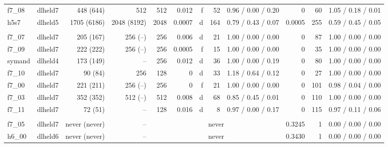 \begin{tabular}{@{}llrrrrrrcrrc@{}}
f7\_08 & dlheld7 & 448 (644) & 512 & 512 & 0.012 & f & 52 & 0.96 / 0.00 / 0.20 & 0 & 60 & 1.05 / 0.18 / 0.01\\
h5s7 & dlheld5 & 1705 (6186) & 2048 (8192) & 2048 & 0.0007 & d & 164 & 0.79 / 0.43 / 0.07 & 0.0005 & 255 & 0.59 / 0.45 / 0.05\\
\addlinespace[2pt]
\multicolumn{12}{@{}l}{\emph{Signed-sum mixtures}}\\
f7\_07 & dlheld7 & 205 (167) & 256 (--) & 256 & 0.006 & d & 21 & 1.00 / 0.00 / 0.00 & 0 & 87 & 1.00 / 0.00 / 0.00\\
f7\_09 & dlheld7 & 222 (222) & 256 (--) & 256 & 0.0005 & f & 15 & 1.00 / 0.00 / 0.00 & 0 & 35 & 1.00 / 0.00 / 0.00\\
symand & dlheld4 & 173 (149) & -- & 256 & 0.012 & d & 36 & 1.00 / 0.00 / 0.19 & 0 & 80 & 1.00 / 0.00 / 0.00\\
f7\_10 & dlheld7 & 90 (84) & 256 & 128 & 0 & d & 33 & 1.18 / 0.64 / 0.12 & 0 & 27 & 1.00 / 0.00 / 0.00\\
f7\_00 & dlheld7 & 221 (211) & 256 (--) & 256 & 0 & f & 21 & 1.00 / 0.00 / 0.00 & 0 & 101 & 0.98 / 0.04 / 0.00\\
f7\_03 & dlheld7 & 352 (352) & 512 (--) & 512 & 0.008 & d & 68 & 0.85 / 0.45 / 0.01 & 0 & 110 & 1.00 / 0.00 / 0.00\\
f7\_11 & dlheld7 & 72 (51) & -- & 128 & 0.016 & d & 8 & 0.97 / 0.00 / 0.17 & 0 & 115 & 0.97 / 0.11 / 0.06\\
\addlinespace[2pt]
\multicolumn{12}{@{}l}{\emph{Residue classes mod 3}}\\
f7\_05 & dlheld7 & never (never) & -- & \multicolumn{5}{c}{never} & 0.3245 & 1 & 0.00 / 0.00 / 0.00\\
h6\_00 & dlheld6 & never (never) & -- & \multicolumn{5}{c}{never} & 0.3430 & 1 & 0.00 / 0.00 / 0.00\\
\bottomrule
\end{tabular}
